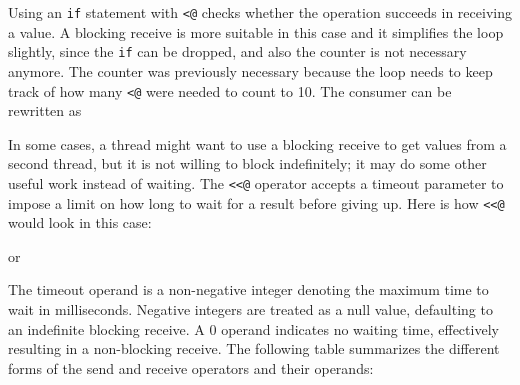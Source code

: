
Using an \texttt{if} statement with \texttt{{<}@} checks whether the operation
succeeds in receiving a value. A blocking receive is more suitable in this case
and it simplifies the loop slightly, since the \texttt{if} can be dropped, and
also the counter is not necessary anymore. The counter was previously necessary
because the loop needs to keep track of how many \texttt{{<}@} were needed to
count to 10. The consumer can be rewritten as


In some cases, a thread might want to use a blocking receive to get values from
a second thread, but it is not willing to block indefinitely; it may do some
other useful work instead of waiting. The \texttt{<{}<@} operator accepts a
timeout parameter to impose a limit on how long to wait for a result before
giving up. Here is how \texttt{<{}<@} would look in this case:


or 


The timeout operand is a non-negative integer denoting the maximum time to wait
in milliseconds.  Negative integers are treated as a null value, defaulting to
an indefinite blocking receive.  A 0 operand indicates no waiting time,
effectively resulting in a non-blocking receive.  The following table summarizes
the different forms of the send and receive operators and their operands:


\bigskip

